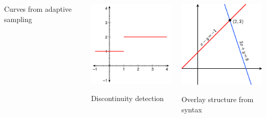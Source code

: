 \documentclass[compress]{beamer}
\begin{document}
\begin{frame}
\begin{columns}
\begin{center}
Curves from adaptive sampling
\end{center}

\begin{center}
\includegraphics[width=\linewidth]{introduction-9.png}

Discontinuity detection
\end{center}

\begin{center}
\includegraphics[width=\linewidth]{IntersectingLines.png}

Overlay structure from syntax
\end{center}
\end{columns}
\end{frame}
\end{document}
